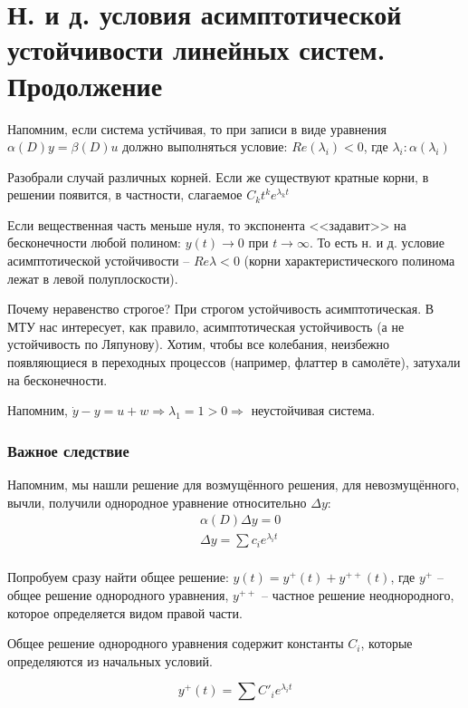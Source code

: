 \documentclass[main.tex]{subfiles}
\begin{document}
\section{Н. и д. условия асимптотической устойчивости линейных систем. Продолжение}

Напомним, если система устйчивая, то при записи в виде уравнения $\alpha(D)y =\beta(D)u$ должно выполняться условие: $Re(\lambda_i) < 0$, где $\lambda_i : \alpha(\lambda_i)$

Разобрали случай различных корней.
Если же существуют кратные корни, в решении появится, в частности, слагаемое $ C_kt^k e^{\lambda_k t} $

Если вещественная часть меньше нуля, то экспонента <<задавит>> на бесконечности любой полином: $ y(t) \to 0 $ при $ t \to \infty $.
То есть н. и д. условие асимптотической устойчивости -- $ \boxed{Re \lambda < 0} $ (корни характеристического полинома лежат в левой полуплоскости).

Почему неравенство строгое?
При строгом устойчивость асимптотическая.
В МТУ нас интересует, как правило, асимптотическая устойчивость (а не устойчивость по Ляпунову).
Хотим, чтобы все колебания, неизбежно появляющиеся в  переходных процессов (например, флаттер в самолёте), затухали на бесконечности.

Напомним, $ \dot y - y = u + w \Rightarrow \lambda_1 = 1 > 0 \Rightarrow $ неустойчивая система.

\subsubsection{Важное следствие}

Напомним, мы нашли решение для возмущённого решения, для невозмущённого, вычли, получили однородное уравнение относительно $ \Delta y $:
\begin{align*}
    & \alpha(D) \Delta y = 0 \\
    & \Delta y = \sum c_i e^{\lambda_i t} \\
\end{align*}

Попробуем сразу найти общее решение: $ y(t) = y^+(t) + y^{++}(t) $, где $y^+$ -- общее решение однородного уравнения, $y^{++}$ -- частное решение неоднородного, которое определяется видом правой части.

Общее решение однородного уравнения содержит константы $ C_i $, которые определяются из начальных условий.

$$ y^+(t) = \sum C'_i e^{\lambda_i t} $$
\end{document}
